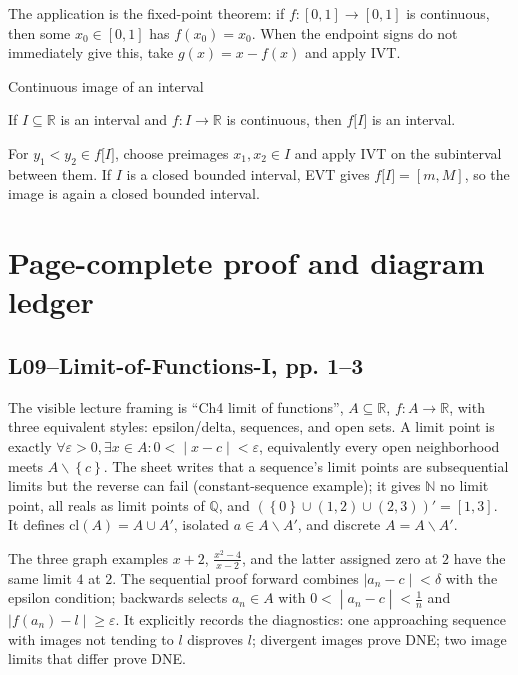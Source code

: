 The application is the fixed-point theorem: if \(f:\left\lbrack {0,1} \right\rbrack\rightarrow\left\lbrack {0,1} \right\rbrack\) is continuous, then some \(x_{0} \in \left\lbrack {0,1} \right\rbrack\) has \(f\left( x_{0} \right) = x_{0}\). When the endpoint signs do not immediately give this, take \(g(x) = x - f(x)\) and apply IVT.

\begin{theorem}{Continuous image of an interval}

If \(I \subseteq \mathbb{R}\) is an interval and \(f:I\rightarrow\mathbb{R}\) is continuous, then \(f\lbrack I\rbrack\) is an interval.

\end{theorem}

For \(y_{1} < y_{2} \in f\lbrack I\rbrack\), choose preimages \(x_{1},x_{2} \in I\) and apply IVT on the subinterval between them. If \(I\) is a closed bounded interval, EVT gives \(f\lbrack I\rbrack = \left\lbrack {m,M} \right\rbrack\), so the image is again a closed bounded interval.

\section{Page-complete proof and diagram ledger}

\subsection{L09--Limit-of-Functions-I, pp. 1--3}

The visible lecture framing is ``Ch4 limit of functions'', \(A \subseteq \mathbb{R}\), \(f:A\rightarrow\mathbb{R}\), with three equivalent styles: epsilon/delta, sequences, and open sets. A limit point is exactly \(\left. \forall\varepsilon > 0,\exists x \in A:0 < \middle| x - c \middle| < \varepsilon \right.\), equivalently every open neighborhood meets \(A \smallsetminus \left\{ c \right\}\). The sheet writes that a sequence's limit points are subsequential limits but the reverse can fail (constant-sequence example); it gives \(\mathbb{N}\) no limit point, all reals as limit points of \(\mathbb{Q}\), and \(\left( {\left\{ 0 \right\} \cup \left( {1,2} \right) \cup \left( {2,3} \right)} \right)' = \left\lbrack {1,3} \right\rbrack\). It defines \(\text{cl}(A) = A \cup A'\), isolated \(a \in A \smallsetminus A'\), and discrete \(A = A \smallsetminus A'\).

The three graph examples \(x + 2\), \(\frac{x^{2} - 4}{x - 2}\), and the latter assigned zero at \(2\) have the same limit \(4\) at \(2\). The sequential proof forward combines \(\left. |a_{n} - c \middle| < \delta \right.\) with the epsilon condition; backwards selects \(a_{n} \in A\) with \(\left. 0 < \middle| a_{n} - c \middle| < \frac{1}{n} \right.\) and \(\left. |f\left( a_{n} \right) - l \middle| \geq \varepsilon \right.\). It explicitly records the diagnostics: one approaching sequence with images not tending to \(l\) disproves \(l\); divergent images prove DNE; two image limits that differ prove DNE.

